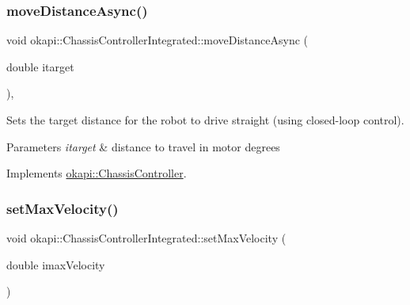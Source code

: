 \mbox{\label{classokapi_1_1ChassisControllerIntegrated_ab3cb8eb0c7d5162aafffe8b8ec2751d5}} 
\subsubsection{\texorpdfstring{moveDistanceAsync()}{moveDistanceAsync()}\hspace{0.1cm}{\footnotesize\ttfamily [2/2]}}
{\footnotesize\ttfamily void okapi\+::\+Chassis\+Controller\+Integrated\+::move\+Distance\+Async (\begin{DoxyParamCaption}\item[{double}]{itarget }\end{DoxyParamCaption})\hspace{0.3cm}{\ttfamily [override]}, {\ttfamily [virtual]}}

Sets the target distance for the robot to drive straight (using closed-\/loop control).


\begin{DoxyParams}{Parameters}
{\em itarget} & distance to travel in motor degrees \\
\hline
\end{DoxyParams}


Implements \mbox{\hyperlink{classokapi_1_1ChassisController_a24b46ec1c42f32c0527d57738a07820a}{okapi\+::\+Chassis\+Controller}}.

\mbox{\label{classokapi_1_1ChassisControllerIntegrated_aaff13c4d1ec3e98a6e153d3602996141}} 
\subsubsection{\texorpdfstring{setMaxVelocity()}{setMaxVelocity()}}
{\footnotesize\ttfamily void okapi\+::\+Chassis\+Controller\+Integrated\+::set\+Max\+Velocity (\begin{DoxyParamCaption}\item[{double}]{imax\+Velocity }\end{DoxyParamCaption})\hspace{0.3cm}{\ttfamily [virtual]}}

